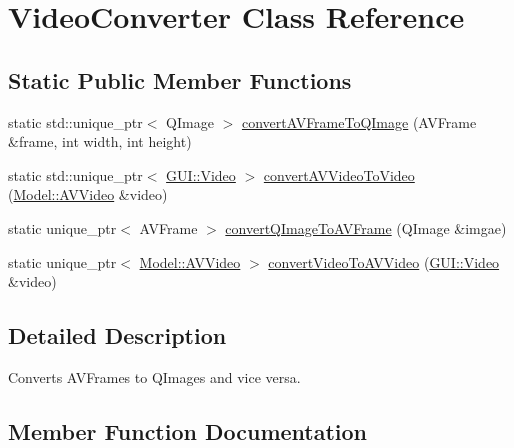 \hypertarget{classUtility_1_1VideoConverter}{}\section{Video\+Converter Class Reference}
\label{classUtility_1_1VideoConverter}
\subsection*{Static Public Member Functions}
\begin{DoxyCompactItemize}
\item 
static std\+::unique\+\_\+ptr$<$ Q\+Image $>$ \hyperlink{classUtility_1_1VideoConverter_a78d44935ccf132db2ad8ae0ba954f535}{convert\+A\+V\+Frame\+To\+Q\+Image} (A\+V\+Frame \&frame, int width, int height)
\item 
static std\+::unique\+\_\+ptr$<$ \hyperlink{classGUI_1_1Video}{G\+U\+I\+::\+Video} $>$ \hyperlink{classUtility_1_1VideoConverter_a332a951771991b5dcc44ec7c126054ad}{convert\+A\+V\+Video\+To\+Video} (\hyperlink{classModel_1_1AVVideo}{Model\+::\+A\+V\+Video} \&video)
\item 
static unique\+\_\+ptr$<$ A\+V\+Frame $>$ \hyperlink{classUtility_1_1VideoConverter_a7d731d86e559fddb8bd389128a7d03c2}{convert\+Q\+Image\+To\+A\+V\+Frame} (Q\+Image \&imgae)
\item 
static unique\+\_\+ptr$<$ \hyperlink{classModel_1_1AVVideo}{Model\+::\+A\+V\+Video} $>$ \hyperlink{classUtility_1_1VideoConverter_a535fc34f9be10f0b6a09cbbc63e6c3a0}{convert\+Video\+To\+A\+V\+Video} (\hyperlink{classGUI_1_1Video}{G\+U\+I\+::\+Video} \&video)
\end{DoxyCompactItemize}


\subsection{Detailed Description}
Converts A\+V\+Frames to Q\+Images and vice versa. 

\subsection{Member Function Documentation}
\hypertarget{classUtility_1_1VideoConverter_a78d44935ccf132db2ad8ae0ba954f535}{}
